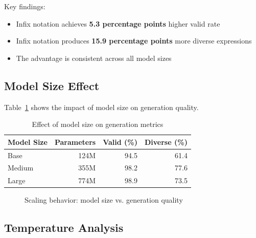 \documentclass[11pt,a4paper]{article}
\begin{document}
Key findings:
\begin{itemize}
    \item Infix notation achieves \textbf{5.3 percentage points} higher valid rate
    \item Infix notation produces \textbf{15.9 percentage points} more diverse expressions
    \item The advantage is consistent across all model sizes
\end{itemize}

\subsection{Model Size Effect}

Table~\ref{tab:size_effect} shows the impact of model size on generation quality.

\begin{table}[H]
\centering
\caption{Effect of model size on generation metrics}
\label{tab:size_effect}
\begin{tabular}{lrrr}
\toprule
\textbf{Model Size} & \textbf{Parameters} & \textbf{Valid (\%)} & \textbf{Diverse (\%)} \\
\midrule
Base & 124M & 94.5 & 61.4 \\
Medium & 355M & 98.2 & 77.6 \\
Large & 774M & 98.9 & 73.5 \\
\bottomrule
\end{tabular}
\end{table}

\begin{figure}[H]
\centering
{}
\caption{Scaling behavior: model size vs. generation quality}
\label{fig:scaling}
\end{figure}

\subsection{Temperature Analysis}
\end{document}
